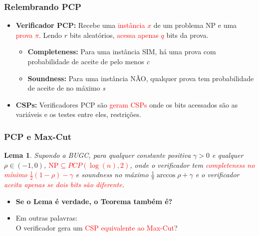 \documentclass[11pt, handout]{beamer}
\newcommand{\red}[1]{\textcolor{red}{#1}}
\newcommand{\green}[1]{\textcolor{pine}{#1}}
\newcommand{\np}{\ensuremath{\mathrm{NP}}\xspace}
\newtheorem{lema}{Lema}
\begin{document}
\begin{frame}[<+->]
\frametitle{Relembrando PCP}
    \begin{itemize}
        \item \textbf{Verificador PCP:} Recebe uma \red{instância $x$} de um problema NP e uma \red{prova $\pi$}. Lendo $r$ bits aleatórios, \red{acessa apenas $q$} bits da prova.
        \begin{itemize}
            \item \textbf{Completeness:} Para uma instância \green{SIM}, há uma prova com probabilidade de \green{aceite de pelo menos \textit{c}}
            \item \textbf{Soundness:} Para uma instância NÃO, qualquer prova tem probabilidade de aceite de no máximo \textit{s} 
        \end{itemize}
        \item \textbf{CSPs:} Verificadores PCP são \red{geram CSPs} onde os bits acessados são as variáveis e os testes entre eles, restrições.
    \end{itemize}

\end{frame}{}


\begin{frame}[<+->]
\frametitle{PCP e Max-Cut}
    \begin{lema}
        Supondo a BUGC, para qualquer constante positiva $\gamma>0$ e qualquer $\rho \in (-1,0)$, \textcolor{red}{$\np \subseteq PCP(\log (n),2)$}, onde o verificador tem \red{\textit{completeness} no mínimo $\frac{1}{2} (1-\rho)-\gamma$} e \textit{soundness} no máximo $\frac{1}{\pi} \arccos{\rho} + \gamma$ e o verificador \red{aceita apenas se dois bits são diferente}.
    \end{lema}
    \begin{itemize}
        \item \textbf{Se o Lema é verdade, o Teorema também é?}
        \item Em outras palavras: \\ 
            O verificador gera um \red{CSP equivalente ao Max-Cut}?
    \end{itemize}
\end{frame}{}
\end{document}
